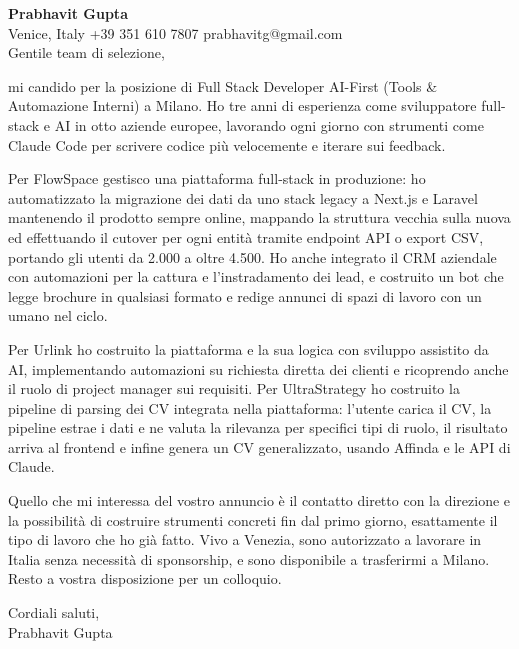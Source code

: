 \documentclass[a4paper,10.5pt]{article}
\begin{document}
\textbf{Prabhavit Gupta}\\
Venice, Italy \textbar{} +39 351 610 7807 \textbar{} prabhavitg@gmail.com\\[10pt]
Gentile team di selezione,

mi candido per la posizione di Full Stack Developer AI-First (Tools \& Automazione Interni) a Milano. Ho tre anni di esperienza come sviluppatore full-stack e AI in otto aziende europee, lavorando ogni giorno con strumenti come Claude Code per scrivere codice più velocemente e iterare sui feedback.

Per FlowSpace gestisco una piattaforma full-stack in produzione: ho automatizzato la migrazione dei dati da uno stack legacy a Next.js e Laravel mantenendo il prodotto sempre online, mappando la struttura vecchia sulla nuova ed effettuando il cutover per ogni entità tramite endpoint API o export CSV, portando gli utenti da 2.000 a oltre 4.500. Ho anche integrato il CRM aziendale con automazioni per la cattura e l'instradamento dei lead, e costruito un bot che legge brochure in qualsiasi formato e redige annunci di spazi di lavoro con un umano nel ciclo.

Per Urlink ho costruito la piattaforma e la sua logica con sviluppo assistito da AI, implementando automazioni su richiesta diretta dei clienti e ricoprendo anche il ruolo di project manager sui requisiti. Per UltraStrategy ho costruito la pipeline di parsing dei CV integrata nella piattaforma: l'utente carica il CV, la pipeline estrae i dati e ne valuta la rilevanza per specifici tipi di ruolo, il risultato arriva al frontend e infine genera un CV generalizzato, usando Affinda e le API di Claude.

Quello che mi interessa del vostro annuncio è il contatto diretto con la direzione e la possibilità di costruire strumenti concreti fin dal primo giorno, esattamente il tipo di lavoro che ho già fatto. Vivo a Venezia, sono autorizzato a lavorare in Italia senza necessità di sponsorship, e sono disponibile a trasferirmi a Milano. Resto a vostra disposizione per un colloquio.

Cordiali saluti,\\
Prabhavit Gupta
\end{document}
